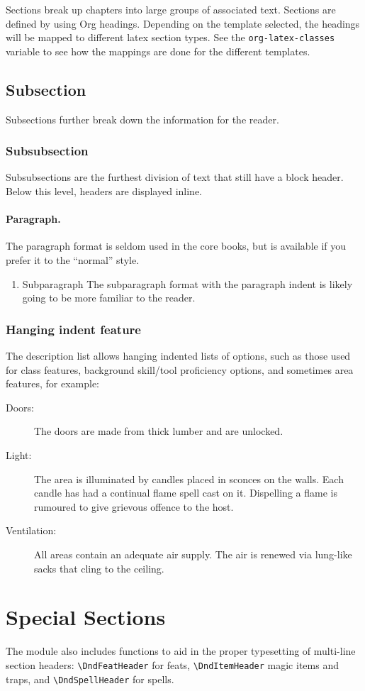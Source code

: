 \documentclass[10pt,twoside,twocolumn,openany,bg=full,notitlepage,nodeprecatedcode]{dndbook}
\begin{document}
Sections break up chapters into large groups of associated text. Sections are defined by using Org headings. Depending on the template selected, the headings will be mapped to different latex section types. See the \texttt{org-latex-classes} variable to see how the mappings are done for the different templates.
\subsection{Subsection}
\label{sec:org37e8b71}
Subsections further break down the information for the reader.
\subsubsection{Subsubsection}
\label{sec:org60fe0a1}
Subsubsections are the furthest division of text that still have a block header. Below this level, headers are displayed
inline.
\paragraph{Paragraph.}
\label{sec:org19539be}
The paragraph format is seldom used in the core books, but is available if you prefer it to the “normal” style.
\begin{enumerate}
\item Subparagraph
\label{sec:org1b77f08}
The subparagraph format with the paragraph indent is likely going to be more familiar to the reader.
\end{enumerate}
\subsubsection{Hanging indent feature}
\label{sec:org4aa007a}
The description list allows hanging indented lists of options, such as those used for class features, background
skill/tool proficiency options, and sometimes area features, for example:
\begin{description}
\item[{Doors:}] The doors are made from thick lumber and are unlocked.
\item[{Light:}] The area is illuminated by candles placed in sconces on the walls. Each candle has had a continual flame spell cast on it. Dispelling a flame is rumoured to give grievous offence to the host.
\item[{Ventilation:}] All areas contain an adequate air supply. The air is renewed via lung-like sacks that cling to the ceiling.
\end{description}
\section{Special Sections}
\label{sec:org0f68d06}
The module also includes functions to aid in the proper typesetting of multi-line section headers: \texttt{\textbackslash{}DndFeatHeader} for feats, \texttt{\textbackslash{}DndItemHeader} magic items and traps, and \texttt{\textbackslash{}DndSpellHeader} for spells.
\end{document}
